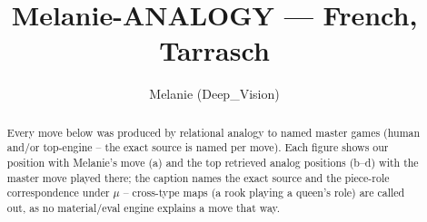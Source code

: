 \documentclass[11pt]{article}
\title{Melanie-ANALOGY — French, Tarrasch}
\author{Melanie (Deep\_Vision)}
\date{}
\begin{document}
\maketitle

\begin{abstract}Every move below was produced by relational analogy to named master games (human and/or top-engine -- the exact source is named per move). Each figure shows our position with Melanie's move (a) and the top retrieved analog positions (b--d) with the master move played there; the caption names the exact source and the piece-role correspondence under $\mu$ -- cross-type maps (a rook playing a queen's role) are called out, as no material/eval engine explains a move that way.\end{abstract}

\begin{figure}[p]\centering
\begin{subfigure}{0.46\textwidth}\centering
\resizebox{\linewidth}{!}{%
\newchessgame
\chessboard[
  setfen={r1bqkb1r/pp1n1ppp/2n1p3/1BppP3/3P4/2P5/PP1N1PPP/R1BQK1NR b KQkq - 2 7},
  showmover=false,
  pgfstyle=straightmove, color=movearrow, markmove={h8-g8}
]}
\caption{}
\end{subfigure}\hfill
\begin{subfigure}{0.46\textwidth}\centering
\resizebox{\linewidth}{!}{%
\newchessgame
\chessboard[
  setfen={rnbqk1nr/pp4pp/2pbp3/3p1p2/2PP4/2NBP3/PP3PPP/R1BQK1NR w KQkq - 0 6},
  showmover=false,
  pgfstyle=straightmove, color=movearrow, markmove={g1-f3}
]}
\caption{}
\end{subfigure}
\\[4pt]
\begin{subfigure}{0.46\textwidth}\centering
\resizebox{\linewidth}{!}{%
\newchessgame
\chessboard[
  setfen={rnbqk1nr/pp4pp/2pbp3/3p1p2/2PP4/2NBP3/PP3PPP/R1BQK1NR w KQkq - 0 6},
  showmover=false,
  pgfstyle=straightmove, color=movearrow, markmove={g1-f3}
]}
\caption{}
\end{subfigure}\hfill
\begin{subfigure}{0.46\textwidth}\centering
\resizebox{\linewidth}{!}{%
\newchessgame
\chessboard[
  setfen={rnbqkb1r/pp1n1ppp/4p3/2ppP3/3P4/2PB4/PP1N1PPP/R1BQK1NR b KQkq - 0 6},
  showmover=false,
  pgfstyle=straightmove, color=movearrow, markmove={b8-c6}
]}
\caption{}
\end{subfigure}

\end{figure}
\end{document}
